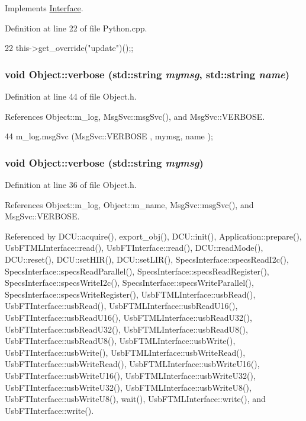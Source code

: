Implements \hyperlink{classInterface_a30e71ffbe36091df9f7c0838dd4b60d2}{Interface}.

Definition at line 22 of file Python.cpp.


\begin{DoxyCode}
22 {this->get_override("update")();};
\end{DoxyCode}
\hypertarget{classObject_a2d4120195317e2a3c6532e8bb9f3da68}{
\subsubsection[{verbose}]{\setlength{\rightskip}{0pt plus 5cm}void Object::verbose (std::string {\em mymsg}, \/  std::string {\em name})}}
\label{classObject_a2d4120195317e2a3c6532e8bb9f3da68}


Definition at line 44 of file Object.h.

References Object::m\_\-log, MsgSvc::msgSvc(), and MsgSvc::VERBOSE.


\begin{DoxyCode}
44 { m_log.msgSvc (MsgSvc::VERBOSE , mymsg, name ); }
\end{DoxyCode}
\hypertarget{classObject_a83d2db2df682907ea1115ad721c1c4a1}{
\subsubsection[{verbose}]{\setlength{\rightskip}{0pt plus 5cm}void Object::verbose (std::string {\em mymsg})}}
\label{classObject_a83d2db2df682907ea1115ad721c1c4a1}


Definition at line 36 of file Object.h.

References Object::m\_\-log, Object::m\_\-name, MsgSvc::msgSvc(), and MsgSvc::VERBOSE.

Referenced by DCU::acquire(), export\_\-obj(), DCU::init(), Application::prepare(), UsbFTMLInterface::read(), UsbFTInterface::read(), DCU::readMode(), DCU::reset(), DCU::setHIR(), DCU::setLIR(), SpecsInterface::specsReadI2c(), SpecsInterface::specsReadParallel(), SpecsInterface::specsReadRegister(), SpecsInterface::specsWriteI2c(), SpecsInterface::specsWriteParallel(), SpecsInterface::specsWriteRegister(), UsbFTMLInterface::usbRead(), UsbFTInterface::usbRead(), UsbFTMLInterface::usbReadU16(), UsbFTInterface::usbReadU16(), UsbFTMLInterface::usbReadU32(), UsbFTInterface::usbReadU32(), UsbFTMLInterface::usbReadU8(), UsbFTInterface::usbReadU8(), UsbFTMLInterface::usbWrite(), UsbFTInterface::usbWrite(), UsbFTMLInterface::usbWriteRead(), UsbFTInterface::usbWriteRead(), UsbFTMLInterface::usbWriteU16(), UsbFTInterface::usbWriteU16(), UsbFTMLInterface::usbWriteU32(), UsbFTInterface::usbWriteU32(), UsbFTMLInterface::usbWriteU8(), UsbFTInterface::usbWriteU8(), wait(), UsbFTMLInterface::write(), and UsbFTInterface::write().


